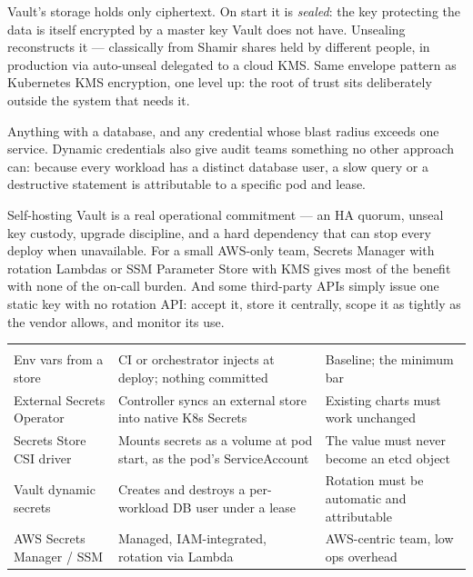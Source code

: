  Vault's storage holds only ciphertext. On start it is \emph{sealed}: the key protecting the data is itself encrypted by a master key Vault does not have. Unsealing reconstructs it --- classically from Shamir shares held by different people, in production via auto-unseal delegated to a cloud KMS. Same envelope pattern as Kubernetes KMS encryption, one level up: the root of trust sits deliberately outside the system that needs it.

 Anything with a database, and any credential whose blast radius exceeds one service. Dynamic credentials also give audit teams something no other approach can: because every workload has a distinct database user, a slow query or a destructive statement is attributable to a specific pod and lease.

 Self-hosting Vault is a real operational commitment --- an HA quorum, unseal key custody, upgrade discipline, and a hard dependency that can stop every deploy when unavailable. For a small AWS-only team, Secrets Manager with rotation Lambdas or SSM Parameter Store with KMS gives most of the benefit with none of the on-call burden. And some third-party APIs simply issue one static key with no rotation API: accept it, store it centrally, scope it as tightly as the vendor allows, and monitor its use.

\begin{center}\small
\wbrowcolors
\begin{tabularx}{\linewidth}{@{}L{34mm} X L{30mm}@{}}
 &  & \\
Env vars from a store & CI or orchestrator injects at deploy; nothing committed & Baseline; the minimum bar\\
External Secrets Operator & Controller syncs an external store into native K8s Secrets & Existing charts must work unchanged\\
Secrets Store CSI driver & Mounts secrets as a volume at pod start, as the pod's ServiceAccount & The value must never become an etcd object\\
Vault dynamic secrets & Creates and destroys a per-workload DB user under a lease & Rotation must be automatic and attributable\\
AWS Secrets Manager / SSM & Managed, IAM-integrated, rotation via Lambda & AWS-centric team, low ops overhead\\
\end{tabularx}
\end{center}

